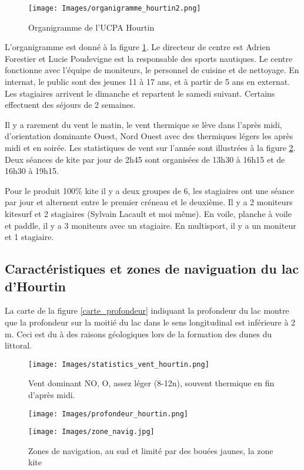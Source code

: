 \documentclass[11pt,a4paper]{report}
\begin{document}
\begin{figure}[h]
\centering
\texttt{[image: Images/organigramme\_hourtin2.png]} 
\caption{Organigramme de l'UCPA Hourtin\label{organi_hourtin}}
\end{figure}

L'organigramme est donné à la figure \ref{organi_hourtin}.
Le directeur de centre est Adrien Forestier et 
Lucie Poudevigne est la responsable des sports nautiques.
Le centre fonctionne avec l'équipe de moniteurs, le personnel 
de cuisine et de nettoyage. En internat, le public sont des jeunes
11 à 17 ans, et  à partir de 5 ans  en externat.
Les stagiaires arrivent le dimanche et repartent
le samedi suivant. Certains effectuent des séjours de 2 semaines.

Il y a rarement du vent le matin, le vent thermique se lève dans
l'après midi, d'orientation dominante Ouest, Nord Ouest avec des
thermiques légers les après midi et  en soirée. Les statistiques
de vent sur l'année sont illustrées à la figure \ref{vent_stats}.
Deux séances de kite par jour de 2h45 sont organisées de
13h30 à 16h15 et de 16h30 à 19h15. 

Pour le produit 100\% kite il y a deux groupes de 6, les stagiaires ont
une séance par jour et alternent entre le premier créneau et le deuxième.
Il y a 2 moniteurs kitesurf et 2 stagiaires (Sylvain Lacault et moi m\^eme).
En voile, planche à voile et paddle, il y a 3 moniteurs avec un stagiaire.
En multisport, il y a un moniteur et 1 stagiaire.

\subsection{Caractéristiques  et zones de naviguation du lac d'Hourtin}
La carte de la figure \ref{carte_profondeur} indiquant la 
profondeur du lac montre que la profondeur sur la moitié du lac
dans le sens longitudinal est inférieure à 2 m. 
Ceci est du à des raisons géologiques lors de la
formation des dunes du littoral.
\begin{figure}
\centering
\texttt{[image: Images/statistics\_vent\_hourtin.png]} 
\caption{Vent dominant NO, O, assez léger (8-12n), 
souvent thermique en fin d'après midi.\label{vent_stats}}
\end{figure}

\begin{figure}
\begin{minipage}{0.4\textwidth}
\texttt{[image: Images/profondeur\_hourtin.png]} 
\caption{Profondeur du lac d'Hourtin, la profondeur est inférieure
à 2m sur la moitié est du lac (limite 2 m en vert)\label{carte_profondeur}}
\end{minipage}
\hfill
\begin{minipage}{0.4\textwidth}
\texttt{[image: Images/zone\_navig.jpg]} 
\caption{Zones de navigation, au sud et limité par des bouées jaunes,
 la zone kite\label{zones_nav}}
 \end{minipage}
\end{figure}
\end{document}

